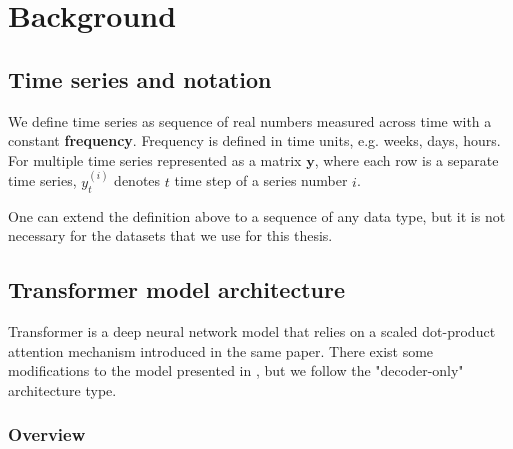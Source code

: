 \documentclass[en]{pracamgr}
\begin{document}
\chapter{Background}\label{r:background}

\section{Time series and notation}

We define time series as sequence of real numbers measured across time with a constant \textbf{frequency}. Frequency is defined in time units, e.g. weeks, days, hours. For multiple time series represented as a matrix $\textbf{y}$, where each row is a separate time series, $y^{(i)}_t$ denotes $t$ time step of a series number $i$.

One can extend the definition above to a sequence of any data type, but it is not necessary for the datasets that we use for this thesis.

%
%
%

\section{Transformer model architecture}\label{s:architecture}

Transformer \cite{tr} is a deep neural network model that relies on a scaled dot-product attention mechanism introduced in the same paper. There exist some modifications to the model presented in \cite{tr}, but we follow the "decoder-only" \cite{wikipedia} architecture type.

\subsection{Overview}
\end{document}
